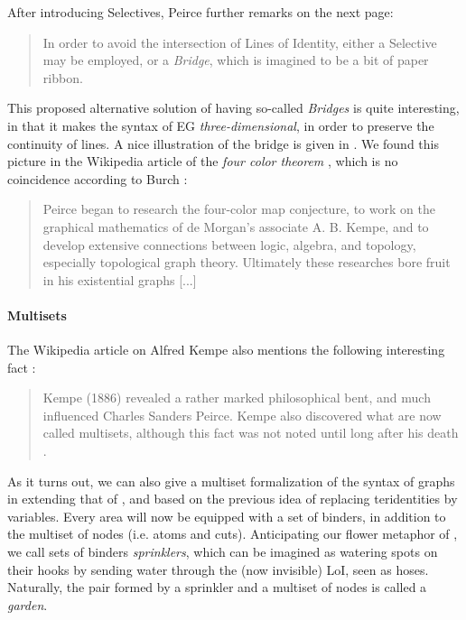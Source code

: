 After introducing Selectives, Peirce further remarks on the next page:
\begin{quote}
  In order to avoid the intersection of Lines of Identity, either a Selective
may be employed, or a \emph{Bridge}, which is imagined to be a bit of paper
ribbon.
\end{quote}
This proposed alternative solution of having so-called \emph{Bridges} is quite
interesting, in that it makes the syntax of EG \emph{three-dimensional}, in
order to preserve the continuity of lines. A nice illustration of the bridge is
given in . We found this picture in the Wikipedia article of
the \emph{four color theorem} \cite{noauthor_four_2023}, which is no coincidence
according to Burch \cite{sep-peirce}:
\begin{quote}
  Peirce began to research the four-color map conjecture, to work on the
graphical mathematics of de Morgan's associate A. B. Kempe, and to develop
extensive connections between logic, algebra, and topology, especially
topological graph theory. Ultimately these researches bore fruit in his
existential graphs [...]
\end{quote}

\paragraph{Multisets}

The Wikipedia article on Alfred Kempe also mentions the following interesting
fact \cite{noauthor_alfred_2023}:
\begin{quote}
  Kempe (1886) revealed a rather marked philosophical bent, and much influenced
Charles Sanders Peirce. Kempe also discovered what are now called multisets,
although this fact was not noted until long after his death
.
\end{quote}
As it turns out, we can also give a multiset formalization of the syntax of
graphs in  extending that of , and based on the
previous idea of replacing teridentities by variables. Every area will now be
equipped with a set of binders, in addition to the multiset of nodes (i.e. atoms
and cuts). Anticipating our flower metaphor of , we call sets of
binders \emph{sprinklers}, which can be imagined as watering spots on their
hooks by sending water through the (now invisible) LoI, seen as hoses.
Naturally, the pair formed by a sprinkler and a multiset of nodes is called a
\emph{garden}.

